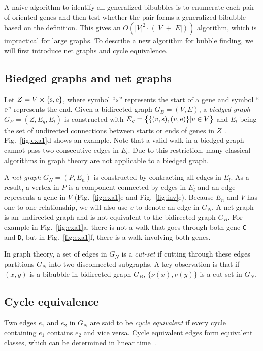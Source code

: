 \documentclass[webpdf,contemporary,large,namedate]{oup-authoring-template}%
\begin{document}
A naive algorithm to identify all generalized bibubbles is to enumerate each pair of oriented genes
and then test whether the pair forms a generalized bibubble based on the definition.
This gives an $O(|V|^2\cdot(|V|+|E|))$ algorithm, which is impractical for large graphs.
To describe a new algorithm for bubble finding, we will first introduce net graphs and cycle equivalence.

\subsection{Biedged graphs and net graphs}

Let $Z=V\times\{{\rm s},{\rm e}\}$, where symbol ``${\rm s}$'' represents the start of a gene
and symbol ``${\rm e}$'' represents the end.
Given a bidirected graph $G_B=(V,E)$, a \emph{biedged graph} $G_E=(Z,E_g,E_l)$ is constructed
with $E_g=\big\{\{(v,{\rm s}),(v,{\rm e})\}|v\in V\big\}$ and $E_l$ being the set of undirected connections between starts or ends of genes in $Z$~\citep{Paten:2018aa}.
Fig.~\ref{fig:exa1}d shows an example.
Note that a valid walk in a biedged graph cannot pass two consecutive edges in $E_l$.
Due to this restriction, many classical algorithms in graph theory are not applicable to a biedged graph.

A \emph{net graph} $G_N=(P,E_n)$ is constructed by contracting all edges in $E_l$.
As a result, a vertex in $P$ is a component connected by edges in $E_l$
and an edge represents a gene in $V$ (Fig.~\ref{fig:exa1}e and Fig.~\ref{fig:inv}e).
Because $E_n$ and $V$ has one-to-one relationship, we will also use $v$ to denote an edge in $G_N$.
A net graph is an undirected graph and is not equivalent to the bidirected graph $G_B$.
For example in Fig.~\ref{fig:exa1}a, there is not a walk that goes through both gene {\tt C} and {\tt D},
but in Fig.~\ref{fig:exa1}f, there is a walk involving both genes.

In graph theory, a set of edges in $G_N$ is a \emph{cut-set} if cutting through these edges
partitions $G_N$ into two disconnected subgraphs.
A key observation is that if $(x,y)$ is a bibubble in bidirected graph $G_B$,
$\{\nu(x),\nu(y)\}$ is a cut-set in $G_N$.

\subsection{Cycle equivalence}

Two edges $e_1$ and $e_2$ in $G_N$ are said to be \emph{cycle equivalent}
if every cycle containing $e_1$ contains $e_2$ and vice versa.
Cycle equivalent edges form equivalent classes, which can be determined in linear time~\citep{DBLP:conf/pldi/JohnsonPP94}.
\end{document}
